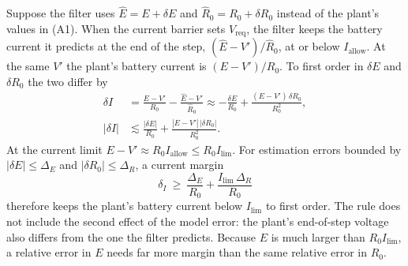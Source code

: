 \begin{remark}\label{rem:sens}
Suppose the filter uses $\hat E = E+\delta E$ and $\hat R_0 = R_0+\delta R_0$ instead of the plant's values in (A1). When the current barrier sets $V_{\mathrm{req}}$, the filter keeps the battery current it predicts at the end of the step, $(\hat E - V')/\hat R_0$, at or below $I_{\mathrm{allow}}$. At the same $V'$ the plant's battery current is $(E-V')/R_0$. To first order in $\delta E$ and $\delta R_0$ the two differ by
\begin{equation}
\begin{split}
\delta I &= \frac{E-V'}{R_0}-\frac{\hat E-V'}{\hat R_0} \approx -\frac{\delta E}{R_0} + \frac{(E-V')\,\delta R_0}{R_0^2},\\
|\delta I| &\lesssim \frac{|\delta E|}{R_0} + \frac{|E-V'|\,|\delta R_0|}{R_0^2}.
\end{split}
\label{eq:sens}
\end{equation}
At the current limit $E-V' \approx R_0 I_{\mathrm{allow}} \le R_0 I_{\lim}$. For estimation errors bounded by $|\delta E|\le\Delta_E$ and $|\delta R_0|\le\Delta_R$, a current margin
\begin{equation}
\delta_I \ \ge\ \frac{\Delta_E}{R_0} + \frac{I_{\lim}\,\Delta_R}{R_0}
\label{eq:marginrule}
\end{equation}
therefore keeps the plant's battery current below $I_{\lim}$ to first order. The rule does not include the second effect of the model error: the plant's end-of-step voltage also differs from the one the filter predicts. Because $E$ is much larger than $R_0 I_{\lim}$, a relative error in $E$ needs far more margin than the same relative error in $R_0$.


\end{remark}
